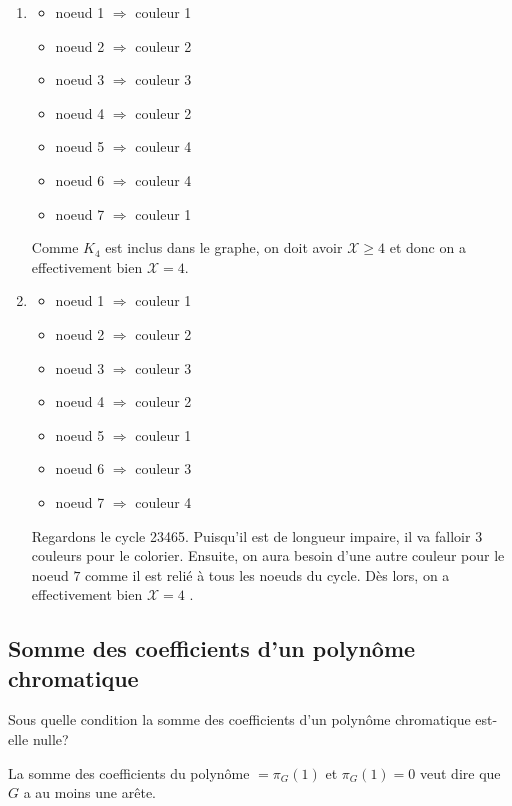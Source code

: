 \begin{solution}
  \begin{enumerate}
    \item 
    \begin{itemize}
    \item noeud 1 $\Rightarrow$ couleur 1
    \item noeud 2 $\Rightarrow$ couleur 2
    \item noeud 3 $\Rightarrow$ couleur 3
    \item noeud 4 $\Rightarrow$ couleur 2
    \item noeud 5 $\Rightarrow$ couleur 4
    \item noeud 6 $\Rightarrow$ couleur 4
    \item noeud 7 $\Rightarrow$ couleur 1
    \end{itemize}
    Comme $K_4$ est inclus dans le graphe, on doit avoir $\mathcal{X} \geq 4$  et donc on a effectivement bien $\mathcal{X} = 4$.
    \item
    \begin{itemize}
    \item noeud 1 $\Rightarrow$ couleur 1
    \item noeud 2 $\Rightarrow$ couleur 2
    \item noeud 3 $\Rightarrow$ couleur 3
    \item noeud 4 $\Rightarrow$ couleur 2
    \item noeud 5 $\Rightarrow$ couleur 1
    \item noeud 6 $\Rightarrow$ couleur 3
    \item noeud 7 $\Rightarrow$ couleur 4
    \end{itemize}
    Regardons le cycle 23465. Puisqu'il est de longueur impaire, il va falloir 3 couleurs pour le colorier. Ensuite, on aura besoin d'une autre couleur pour le noeud $7$ comme il est relié à tous les noeuds du cycle. Dès lors, on a effectivement bien $\mathcal{X} = 4$ .
     \end{enumerate}
\end{solution}

\subsection{Somme des coefficients d'un polynôme chromatique}
Sous quelle condition la somme des coefficients d'un polynôme chromatique est-elle nulle?

\begin{solution}
  La somme des coefficients du polynôme $= \pi_G(1)$ et $\pi_G(1) = 0$ veut dire que $G$ a au moins une arête.
\end{solution}

